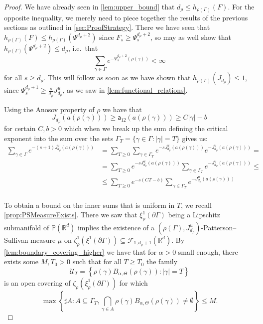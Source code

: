 \documentclass{report}
\begin{document}
\begin{proof}
    We have already seen in \cref{lem:upper_bound} that $d_\rho \leq h_{\rho(\Gamma)}(F)$.
    For the opposite inequality, we merely need to piece together the results of the previous sections as outlined in \cref{sec:ProofStrategy}.
    There we have seen that $h_{\rho(\Gamma)}(F) \leq h_{\rho(\Gamma)}(\Psi^{d_\rho + 2})$ since $F_s \geq \Psi_s^{d_\rho + 2}$, so may as well show that $h_{\rho(\Gamma)}(\Psi^{d_\rho + 2}) \leq d_\rho$, i.e.\ that
    \[
        \sum_{\gamma \in \Gamma} e^{-\Psi^{d_\rho + 2}_s(\rho(\gamma))} < \infty
    \]
    for all $s \geq d_\rho$.
    This will follow as soon as we have shown that $h_{\rho(\Gamma)}(J_{d_\rho}) \leq 1$, since $\Psi_s^{d_\rho + 1} \geq \frac{s}{d_\rho} J_{d_\rho}^u$, as we saw in \cref{lem:functional_relations}.
    
    Using the Anosov property of $\rho$ we have that
    \[
    J_{d_\rho}(a(\rho(\gamma))) \geq \mathsf a_{12} (a(\rho(\gamma))) \geq C|\gamma| - b    
    \]
    for certain $C, b > 0$ which when we break up the sum defining the critical exponent into the sum over the sets $\Gamma_T = \{ \gamma \in \Gamma: |\gamma| = T\}$ gives us:
    \begin{align*}
        \sum_{\gamma \in \Gamma} e^{-(s+1)J_{d_\rho}^u(a(\rho(\gamma)))} &=
        \sum_{T \geq 0} \sum_{\gamma \in \Gamma_T} e^{-s J_{d_\rho}^u(a(\rho(\gamma)))}
        e^{-J_{d_\rho}^u(a(\rho(\gamma)))} =\\
        &=
        \sum_{T \geq 0} e^{-s J_{d_\rho}^u(a(\rho(\gamma)))} 
            \sum_{\gamma \in \Gamma_T} e^{-J_{d_\rho}^u(a(\rho(\gamma)))} \leq\\
        &\leq
        \sum_{T \geq 0} e^{-s (C T - b)} 
            \sum_{\gamma \in \Gamma_T} e^{-J_{d_\rho}^u(a(\rho(\gamma)))}\\
    \end{align*}
    
    To obtain a bound on the inner sums that is uniform in $T$, we recall \cref{prop:PSMeasureExists}. 
    There we saw that $\xi^1_\rho(\partial \Gamma)$ being a Lipschitz submanifold of $\mathbb P(\mathbb R^d)$ implies the existence of a $(\rho(\Gamma), J_{d_\rho}^u)$-Patterson--Sullivan measure $\mu$ on $\zeta^1_\rho(\xi^1(\partial \Gamma)) \subseteq \mathcal F_{1, d_\rho + 1}(\mathbb R^d)$.
    By \cref{lem:boundary_covering_higher} we have that for $\alpha > 0$ small enough, there exists some $M, T_0 > 0$ such that for all $T \geq T_0$ the family
    \[
        \mathcal U_T = \left\{ \rho(\gamma) B_{\alpha, \Theta}(\rho(\gamma)) : |\gamma| = T \right\}
    \]
    is an open covering of $\zeta_\rho(\xi^1_\rho(\partial \Gamma))$ for which
    \[
        \max
        \left\{\sharp A : A \subseteq \Gamma_T,  \bigcap_{\gamma \in A}\rho(\gamma)B_{\alpha, \Theta}(\rho(\gamma)) \neq \emptyset \right\} \leq M.
    \]


\end{proof}
\end{document}
